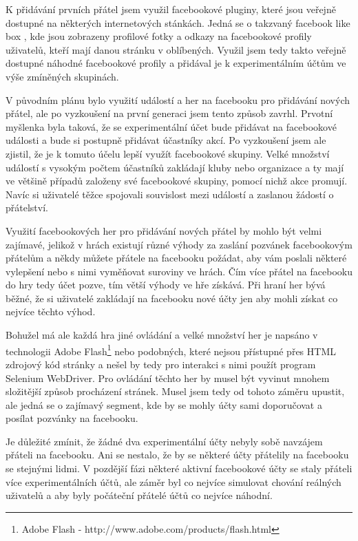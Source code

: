 \documentclass[thesis=M,czech]{FITthesis}[2013/05/10]
\begin{document}
K přidávání prvních přátel jsem využil facebookové pluginy, které jsou veřejně dostupné na některých internetových stánkách. Jedná se o takzvaný facebook like box \cite{web:fbLikeBox}, kde jsou zobrazeny profilové fotky a odkazy na facebookové profily uživatelů, kteří mají danou stránku v oblíbených. Využil jsem tedy takto veřejně dostupné náhodné facebookové profily a přidával je k experimentálním účtům ve výše zmíněných skupinách.

V původním plánu bylo využití událostí a her na facebooku pro přidávání nových přátel, ale po vyzkoušení na první generaci jsem tento způsob zavrhl. Prvotní myšlenka byla taková, že se experimentální účet bude přidávat na facebookové události a bude si postupně přidávat účastníky akcí. Po vyzkoušení jsem ale zjistil, že je k tomuto účelu lepší využít facebookové skupiny. Velké množství událostí s vysokým počtem účastníků zakládají kluby nebo organizace a ty mají ve většině případů založeny své facebookové skupiny, pomocí nichž akce promují. Navíc si uživatelé těžce spojovali souvislost mezi událostí a zaslanou žádostí o přátelství.

Využití facebookových her pro přidávání nových přátel by mohlo být velmi zajímavé, jelikož v hrách existují různé výhody za zaslání pozvánek facebookovým přátelům a někdy můžete přátele na facebooku požádat, aby vám poslali některé vylepšení nebo s nimi vyměňovat suroviny ve hrách. Čím více přátel na facebooku do hry tedy účet pozve, tím větší výhody ve hře získává. Při hraní her bývá běžné, že si uživatelé zakládají na facebooku nové účty jen aby mohli získat co nejvíce těchto výhod.

Bohužel má ale každá hra jiné ovládání a velké množství her je napsáno v technologii Adobe Flash\footnote{Adobe Flash - http://www.adobe.com/products/flash.html} nebo podobných, které nejsou přístupné přes HTML zdrojový kód stránky a nešel by tedy pro interakci s nimi použít program Selenium WebDriver. Pro ovládání těchto her by musel být vyvinut mnohem složitější způsob procházení stránek. Musel jsem tedy od tohoto záměru upustit, ale jedná se o zajímavý segment, kde by se mohly účty sami doporučovat a posílat pozvánky na facebooku.

Je důležité zmínit, že žádné dva experimentální účty nebyly sobě navzájem přáteli na facebooku. Ani se nestalo, že by se některé účty přátelily na facebooku se stejnými lidmi. V pozdější fázi některé aktivní facebookové účty se staly přáteli více experimentálních účtů, ale záměr byl co nejvíce simulovat chování reálných uživatelů a aby byly počáteční přátelé účtů co nejvíce náhodní.
\end{document}
